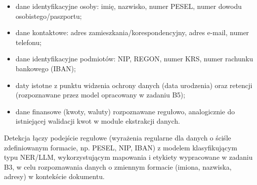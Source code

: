 \begin{itemize}
    \item dane identyfikacyjne osoby: imię, nazwisko, numer PESEL, numer dowodu osobistego/paszportu;
    \item dane kontaktowe: adres zamieszkania/korespondencyjny, adres e-mail, numer telefonu;
    \item dane identyfikacyjne podmiotów: NIP, REGON, numer KRS, numer rachunku bankowego (IBAN);
    \item daty istotne z punktu widzenia ochrony danych (data urodzenia) oraz retencji (rozpoznawane przez model opracowany w zadaniu B5);
    \item dane finansowe (kwoty, waluty) rozpoznawane regułowo, analogicznie do istniejącej walidacji kwot w module ekstrakcji danych.
\end{itemize}

Detekcja łączy podejście regułowe (wyrażenia regularne dla danych o ściśle zdefiniowanym formacie, np. PESEL, NIP, IBAN) z modelem klasyfikującym typu NER/LLM, wykorzystującym mapowania i etykiety wypracowane w zadaniu B3, w celu rozpoznawania danych o zmiennym formacie (imiona, nazwiska, adresy) w kontekście dokumentu.


